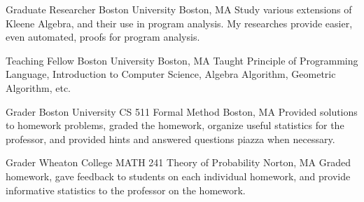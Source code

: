 \documentclass[11pt,roman]{moderncv}        %
\begin{document}
{Graduate Researcher}
{Boston University}
{Boston, MA}{}
{Study various extensions of Kleene Algebra, and their use in program analysis.
My researches provide easier, even automated, proofs for program analysis.
}

{Teaching Fellow}
{Boston University}
{Boston, MA}{}
{
  Taught Principle of Programming Language, Introduction to Computer Science,
  Algebra Algorithm, Geometric Algorithm, etc.
}

{Grader}
{Boston University CS 511 Formal Method}
{Boston, MA}{}
{Provided solutions to homework problems, graded the homework,
organize useful statistics for the professor, 
and provided hints and answered questions piazza when necessary.}

{Grader}
{Wheaton College MATH 241 Theory of Probability}
{Norton, MA}{}
{Graded homework, gave feedback to students on each individual homework,
and provide informative statistics to the professor on the homework.}
\end{document}
